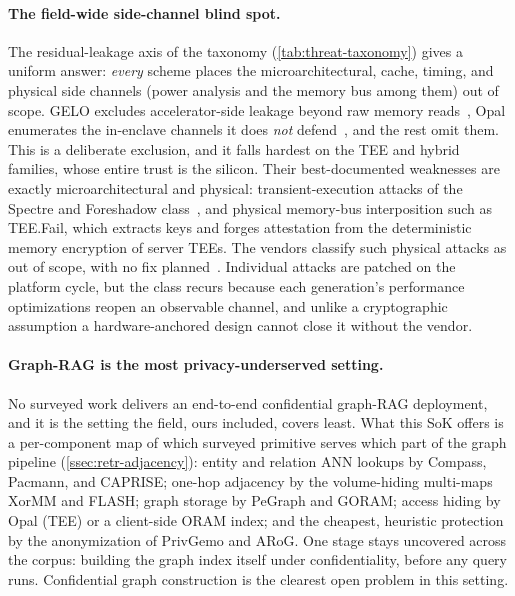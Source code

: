 \paragraph{The field-wide side-channel blind spot.}
\label{ssec:sidechannel}
The residual-leakage axis of the taxonomy (\cref{tab:threat-taxonomy}) gives a uniform answer:
\emph{every} scheme places the microarchitectural, cache, timing, and physical side channels
(power analysis and the memory bus among them) out of scope. GELO excludes accelerator-side leakage beyond raw memory
reads~\citep{belikov_gelo}, Opal enumerates the in-enclave channels it does \emph{not}
defend~\citep{kaviani_opal}, and the rest omit them. This is a deliberate exclusion, and it
falls hardest on the TEE and hybrid families, whose entire trust is the silicon. Their
best-documented weaknesses are exactly microarchitectural and physical: transient-execution
attacks of the Spectre and Foreshadow class~\citep{spectre,foreshadow}, and physical memory-bus
interposition such as TEE.Fail, which extracts keys and forges attestation from the
deterministic memory encryption of server TEEs. The vendors classify such physical attacks as
out of scope, with no fix planned~\citep{tee_fail}. Individual attacks are patched on the platform cycle, but
the class recurs because each generation's performance optimizations reopen an observable
channel, and unlike a cryptographic assumption a hardware-anchored design cannot close it
without the vendor.

\paragraph{Graph-RAG is the most privacy-underserved setting.}
No surveyed work delivers an end-to-end confidential graph-RAG deployment, and it is the setting
the field, ours included, covers least. What this SoK offers is a per-component map of which
surveyed primitive serves which part of the graph pipeline (\cref{ssec:retr-adjacency}): entity and
relation ANN lookups by Compass, Pacmann, and CAPRISE; one-hop adjacency by the volume-hiding
multi-maps XorMM and FLASH; graph storage by PeGraph and GORAM; access hiding by Opal (TEE) or a client-side ORAM index;
and the cheapest, heuristic protection by the anonymization of PrivGemo and ARoG. One stage
stays uncovered across the corpus: building the graph index itself under confidentiality, before
any query runs. Confidential graph construction is the clearest open problem in this setting.


